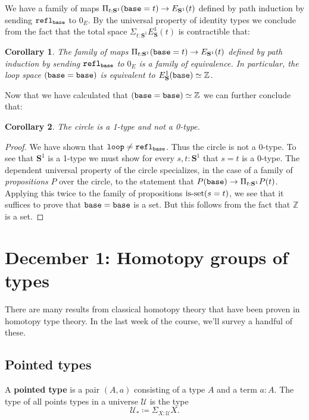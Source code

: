 \documentclass{amsart}
\theoremstyle{theorem}
\newtheorem*{cor}{Corollary}
\theoremstyle{definition}
\theoremstyle{remark}
\newcommand{\0}{\mathbbe{0}}
\newcommand{\1}{\mathbbe{1}}
\newcommand{\2}{\mathbbe{2}}
\newcommand{\3}{\mathbbe{3}}
\newcommand{\4}{\mathbbe{4}}
\newcommand{\ZZ}{\mathbb{Z}}
\newcommand{\term}[1]{{\textup{\texttt{#1}}}}
\newcommand{\type}[1]{{\textup{#1}}}
\newcommand{\refl}{\term{refl}}
\newcommand{\UU}{{\mathcal{U}}}
\newcommand{\is}[1]{\type{is-{#1}}}
\newcommand{\Sone}{\mathbf{S}^1}
\newcommand{\base}{\term{base}}
\newcommand{\lloop}{\term{loop}}
\begin{document}
We have a family of maps $\Pi_{t : \Sone} (\base=t) \to E_{\Sone}(t)$ defined by path induction by sending $\refl_\base$ to $0_E$. By the universal property of identity types we conclude from the fact that the total space $\Sigma_{t: \Sone} E_\Sone(t)$ is contractible that:

\begin{cor} The family of maps $\Pi_{t : \Sone} (\base=t) \to E_{\Sone}(t)$ defined by path induction by sending $\refl_\base$ to $0_E$ is a family of equivalence. In particular, the loop space $(\base=\base)$ is equivalent to $E_\Sone(\base)\simeq \ZZ$.
\end{cor}

Now that we have calculated that $(\base=\base) \simeq \ZZ$ we can further conclude that:

\begin{cor} The circle is a 1-type and not a 0-type.
\end{cor}
\begin{proof}
We have shown that $\lloop \neq \refl_\base$. Thus the circle is not a 0-type. To see that $\Sone$ is a 1-type we must show for every $s,t : \Sone$ that $s=t$ is a 0-type. The dependent universal property of the circle specializes, in the case of a family of \emph{propositions} $P$ over the circle, to the statement that $P(\base) \to \Pi_{t : \Sone} P(t)$. Applying this twice to the family of propositions $\is{set}(s=t)$, we see that it suffices to prove that $\base=\base$ is a set. But this follows from the fact that $\ZZ$ is a set.
\end{proof}



\section*{December 1: Homotopy groups of types}

There are many results from classical homotopy theory that have been proven in homotopy type theory. In the last week of the course, we'll survey a handful of these.

\subsection*{Pointed types}

A \textbf{pointed type} is a pair $(A,a)$ consisting of a type $A$ and a term $a : A$. The type of all points types in a universe $\UU$ is the type
\[ \UU_* \coloneq \Sigma_{X : \UU} X.\]
\end{document}
